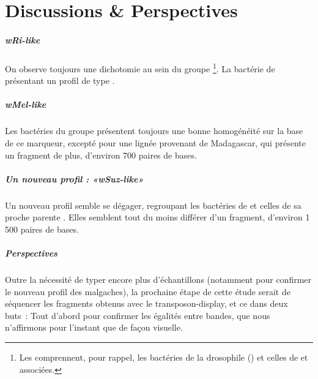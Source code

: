 
\chapter{Discussions \& Perspectives} %
\label{sec:discussions}

\paragraph{wRi-like} %
\label{par:wri_like}
On observe toujours une dichotomie au sein du groupe \footnote{Les  comprennent, pour rappel, les bactéries de la drosophile  () et celles de  et associées.}. La bactérie de  présentant un profil de type .

\paragraph{wMel-like} %
\label{par:wmel_like}
Les bactéries du groupe  présentent toujours une bonne homogénéité sur la base de ce marqueur, excepté pour une lignée provenant de Madagascar, qui présente un fragment de plus, d'environ 700 paires de bases.

\paragraph{Un nouveau profil : «\textit{wSuz-like}»} %
\label{par:suzukii}
Un nouveau profil semble se dégager, regroupant les bactéries de  et celles de sa proche parente . Elles semblent tout du moins différer d'un fragment, d'environ 1\,500 paires de bases.

\paragraph{Perspectives\\} %
\label{par:perspectives}
Outre la nécessité de typer encore plus d'échantillons (notamment pour confirmer le nouveau profil des  malgaches),
la prochaine étape de cette étude serait de séquencer les fragments obtenus avec le transposon-display, et ce dans deux buts~:
Tout d'abord pour confirmer les égalités entre bandes, que nous n'affirmons pour l'instant que de façon visuelle.


